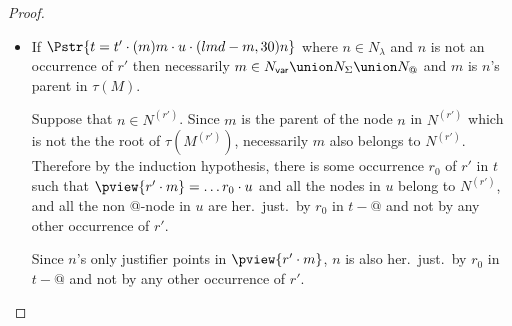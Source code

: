 \begin{proof}
\begin{itemize}
\begin{itemize}

    \item If $\Pstr{ t =  t' \cdot (m){m} \cdot u \cdot (lmd-m,30){n} }$
    where $n \in N_\lambda$ and $n$ is not an occurrence of $r'$ then necessarily $m\in N_{\sf var} \union
    N_\Sigma \union N_@$ and $m$ is $n$'s parent in $\tau(M)$.

    Suppose that $n\in N^{(r')}$. Since $m$ is the parent of the node $n$ in $N^{(r')}$ which is not the the root of $\tau(M^{(r')})$, necessarily $m$ also belongs to $N^{(r')}$. Therefore by the induction hypothesis, there is some occurrence $r_0$ of $r'$ in $t$ such that $\pview{r' \cdot m} = \ldots r_0 \cdot u$ and all the nodes in $u$
    belong to $N^{(r')}$, and all the non @-node in $u$ are her.\ just.\ by $r_0$ in $t-@$
    and not by any other occurrence of $r'$.

    Since $n$'s only justifier points in $\pview{r' \cdot m}$, $n$ is also her.\ just.\ by $r_0$ in $t-@$
    and not by any other occurrence of $r'$.


\end{itemize}
\end{itemize}
\end{proof}
